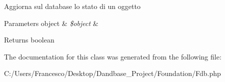 Aggiorna sul database lo stato di un oggetto


\begin{DoxyParams}[1]{Parameters}
object & {\em \$object} & \\
\hline
\end{DoxyParams}
\begin{DoxyReturn}{Returns}
boolean 
\end{DoxyReturn}


The documentation for this class was generated from the following file\+:\begin{DoxyCompactItemize}
\item 
C\+:/\+Users/\+Francesco/\+Desktop/\+Dandbase\+\_\+\+Project/\+Foundation/Fdb.\+php\end{DoxyCompactItemize}
